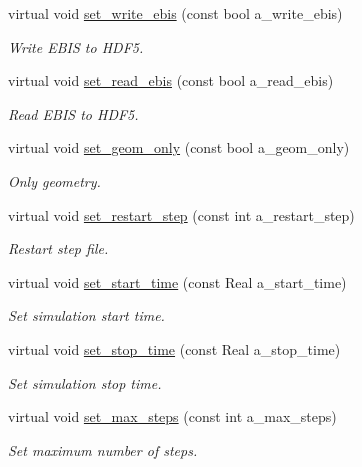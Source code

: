 \begin{DoxyCompactItemize}
virtual void \hyperlink{classplasma__engine_a539a354caf0758b7f0927f33b303abd8}{set\+\_\+write\+\_\+ebis} (const bool a\+\_\+write\+\_\+ebis)
\begin{DoxyCompactList}\small\item\em Write E\+B\+IS to H\+D\+F5. \end{DoxyCompactList}\item 
virtual void \hyperlink{classplasma__engine_afed60e3d7df97f68b25514c4c7f7848d}{set\+\_\+read\+\_\+ebis} (const bool a\+\_\+read\+\_\+ebis)
\begin{DoxyCompactList}\small\item\em Read E\+B\+IS to H\+D\+F5. \end{DoxyCompactList}\item 
virtual void \hyperlink{classplasma__engine_aa1ca616d8fa13d09af2e9b7290e9b541}{set\+\_\+geom\+\_\+only} (const bool a\+\_\+geom\+\_\+only)
\begin{DoxyCompactList}\small\item\em Only geometry. \end{DoxyCompactList}\item 
virtual void \hyperlink{classplasma__engine_a8387551a25bce6793cbc5d27b61616e2}{set\+\_\+restart\+\_\+step} (const int a\+\_\+restart\+\_\+step)
\begin{DoxyCompactList}\small\item\em Restart step file. \end{DoxyCompactList}\item 
virtual void \hyperlink{classplasma__engine_aaeb6dae0d41de4d47b74351156d1eb4f}{set\+\_\+start\+\_\+time} (const Real a\+\_\+start\+\_\+time)
\begin{DoxyCompactList}\small\item\em Set simulation start time. \end{DoxyCompactList}\item 
virtual void \hyperlink{classplasma__engine_a9323854fc79186855715001a73248337}{set\+\_\+stop\+\_\+time} (const Real a\+\_\+stop\+\_\+time)
\begin{DoxyCompactList}\small\item\em Set simulation stop time. \end{DoxyCompactList}\item 
virtual void \hyperlink{classplasma__engine_a096bf36a3cadb7eab8f82259d124fe8a}{set\+\_\+max\+\_\+steps} (const int a\+\_\+max\+\_\+steps)
\begin{DoxyCompactList}\small\item\em Set maximum number of steps. \end{DoxyCompactList}\item 

\end{DoxyCompactItemize}
